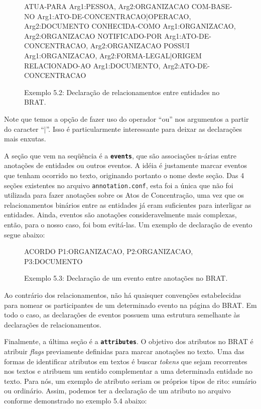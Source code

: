 \documentclass[11pt]{report}
\newcommand{\quotes}[1]{``#1''}
\begin{document}
\begin{figure}[h!]
\centering
\begin{boxedverbatim}
[relations]

ATUA-PARA       Arg1:PESSOA, Arg2:ORGANIZACAO
COM-BASE-NO     Arg1:ATO-DE-CONCENTRACAO|OPERACAO, Arg2:DOCUMENTO
CONHECIDA-COMO  Arg1:ORGANIZACAO, Arg2:ORGANIZACAO
NOTIFICADO-POR  Arg1:ATO-DE-CONCENTRACAO, Arg2:ORGANIZACAO
POSSUI          Arg1:ORGANIZACAO, Arg2:FORMA-LEGAL|ORIGEM
RELACIONADO-AO  Arg1:DOCUMENTO, Arg2:ATO-DE-CONCENTRACAO
\end{boxedverbatim}
\caption*{Exemplo 5.2: Declaração de relacionamentos entre entidades no BRAT.}
\end{figure}

Note que temos a opção de fazer uso do operador \quotes{ou} nos argumentos a partir do caracter \quotes{$\vert$}. Isso é particularmente interessante para deixar as
declarações mais enxutas.

A seção que vem na seqüência é a \textbf{\texttt{events}}, que são associações n-árias entre anotações de entidades ou outros eventos. A idéia é justamente marcar eventos que
tenham ocorrido no texto, originando portanto o nome deste seção. Das 4 seções existentes no arquivo \texttt{annotation.conf}, esta foi a única que não foi utilizada para
fazer anotações sobre os Atos de Concentração, uma vez que os relacionamentos binários entre as entidades já eram suficientes para interligar as entidades. Ainda, eventos
são anotações consideravelmente mais complexas, então, para o nosso caso, foi bom evitá-las. Um exemplo de declaração de evento segue abaixo:

\begin{figure}[h!]
\centering
\begin{boxedverbatim}
[events]

ACORDO  P1:ORGANIZACAO, P2:ORGANIZACAO, P3:DOCUMENTO
\end{boxedverbatim}
\caption*{Exemplo 5.3: Declaração de um evento entre anotações no BRAT.}
\end{figure}

Ao contrário dos relacionamentos, não há quaisquer convenções estabelecidas para nomear os participantes de um determinado evento na página do BRAT. Em todo o caso, as declarações
de eventos possuem uma estrutura semelhante às declarações de relacionamentos.

Finalmente, a última seção é a \textbf{\texttt{attributes}}. O objetivo dos atributos no BRAT é atribuir \textit{flags} previamente definidas para marcar anotações no texto.
Uma das formas de identificar atributos em textos é buscar \textit{tokens} que sejam recorrentes nos textos e atribuem um sentido complementar a uma determinada entidade no texto.
Para nós, um exemplo de atributo seriam os próprios tipos de rito: sumário ou ordinário. Assim, podemos ter a declaração de um atributo no arquivo conforme demonstrado no exemplo
5.4 abaixo:
\end{document}

